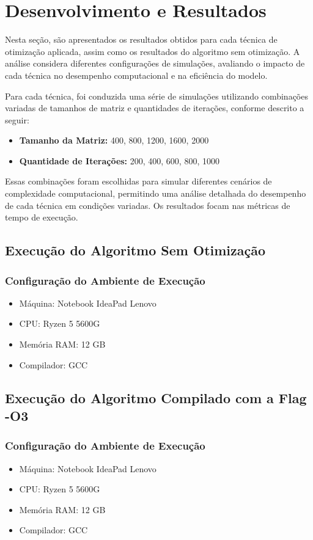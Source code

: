 \section{Desenvolvimento e Resultados}

Nesta seção, são apresentados os resultados obtidos para cada técnica de otimização aplicada, assim como os resultados do algoritmo sem otimização. A análise considera diferentes configurações de simulações, avaliando o impacto de cada técnica no desempenho computacional e na eficiência do modelo.

Para cada técnica, foi conduzida uma série de simulações utilizando combinações variadas de tamanhos de matriz e quantidades de iterações, conforme descrito a seguir:

\begin{itemize}
    \item \textbf{Tamanho da Matriz:} 400, 800, 1200, 1600, 2000
    \item \textbf{Quantidade de Iterações:} 200, 400, 600, 800, 1000
\end{itemize}

Essas combinações foram escolhidas para simular diferentes cenários de complexidade computacional, permitindo uma análise detalhada do desempenho de cada técnica em condições variadas. Os resultados focam nas métricas de tempo de execução.

\subsection{Execução do Algoritmo Sem Otimização}
\subsubsection{Configuração do Ambiente de Execução}
\begin{itemize}
    \item Máquina: Notebook IdeaPad Lenovo
    \item CPU: Ryzen 5 5600G
    \item Memória RAM: 12 GB
    \item Compilador: GCC
\end{itemize}

\subsection{Execução do Algoritmo Compilado com a Flag -O3}
\subsubsection{Configuração do Ambiente de Execução}
\begin{itemize}
    \item Máquina: Notebook IdeaPad Lenovo
    \item CPU: Ryzen 5 5600G
    \item Memória RAM: 12 GB
    \item Compilador: GCC
\end{itemize}

